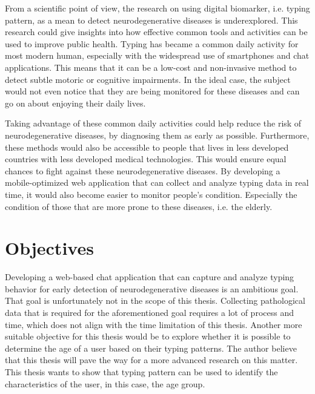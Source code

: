 From a scientific point of view, the research on using digital biomarker, i.e. typing pattern, as a mean to detect neurodegenerative diseases is underexplored.
This research could give insights into how effective common tools and activities can be used to improve public health.
Typing has became a common daily activity for most modern human, especially with the widespread use of smartphones and chat applications.
This means that it can be a low-cost and non-invasive method to detect subtle motoric or cognitive impairments.
In the ideal case, the subject would not even notice that they are being monitored for these diseases and can go on about enjoying their daily lives.

Taking advantage of these common daily activities could help reduce the risk of neurodegenerative diseases, by diagnosing them as early as possible.
Furthermore, these methods would also be accessible to people that lives in less developed countries with less developed medical technologies.
This would ensure equal chances to fight against these neurodegenerative diseases.
By developing a mobile-optimized web application that can collect and analyze typing data in real time, it would also become easier to monitor people's condition.
Especially the condition of those that are more prone to these diseases, i.e. the elderly.

\section{Objectives}


Developing a web-based chat application that can capture and analyze typing behavior for early detection of neurodegenerative diseases is an ambitious goal.
That goal is unfortunately not in the scope of this thesis.
Collecting pathological data that is required for the aforementioned goal requires a lot of process and time, which does not align with the time limitation of this thesis.
Another more suitable objective for this thesis would be to explore whether it is possible to determine the age of a user based on their typing patterns.
The author believe that this thesis will pave the way for a more advanced research on this matter.
This thesis wants to show that typing pattern can be used to identify the characteristics of the user, in this case, the age group.

